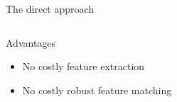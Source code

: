\documentclass[10pt]{beamer}
\newcommand{\mycite}[1]{ {\color{gray} \citep{#1}} }
\begin{document}
\begin{frame}{The direct approach}
\begin{columns}
\begin{column}{0.5\textwidth}
		\end{column}
	\end{columns}
	\begin{columns}
		\begin{column}{0.9\textwidth}
			\begin{block}{Advantages}
				\begin{itemize}
					\item No costly feature extraction
					\item No costly robust feature matching
				\end{itemize}
			\end{block}
			\mycite{Forster2014NSLAM}
		\end{column}
		\begin{column}{0.1\textwidth}
		\end{column}
	\end{columns}	
\end{frame}
\end{document}

